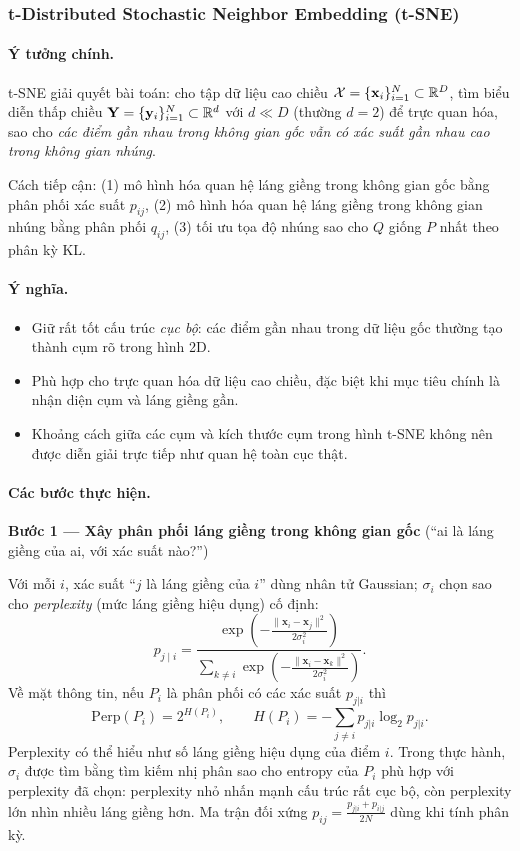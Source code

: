 \subsubsection{t-Distributed Stochastic Neighbor Embedding (t-SNE)}
\label{sec:tsne}

\paragraph{Ý tưởng chính.}
t-SNE \cite{vandermaaten2008tsne} giải quyết bài toán: cho tập dữ liệu cao chiều $\mathcal{X} = \{\mathbf{x}_i\}_{i=1}^N \subset \mathbb{R}^D$, tìm biểu diễn thấp chiều $\mathbf{Y} = \{\mathbf{y}_i\}_{i=1}^N \subset \mathbb{R}^d$ với $d \ll D$ (thường $d=2$) để trực quan hóa, sao cho \emph{các điểm gần nhau trong không gian gốc vẫn có xác suất gần nhau cao trong không gian nhúng}.

Cách tiếp cận: (1) mô hình hóa quan hệ láng giềng trong không gian gốc bằng phân phối xác suất $p_{ij}$, (2) mô hình hóa quan hệ láng giềng trong không gian nhúng bằng phân phối $q_{ij}$, (3) tối ưu tọa độ nhúng sao cho $Q$ giống $P$ nhất theo phân kỳ KL.

\paragraph{Ý nghĩa.}
\begin{itemize}
  \item Giữ rất tốt cấu trúc \emph{cục bộ}: các điểm gần nhau trong dữ liệu gốc thường tạo thành cụm rõ trong hình 2D.
  \item Phù hợp cho trực quan hóa dữ liệu cao chiều, đặc biệt khi mục tiêu chính là nhận diện cụm và láng giềng gần.
  \item Khoảng cách giữa các cụm và kích thước cụm trong hình t-SNE không nên được diễn giải trực tiếp như quan hệ toàn cục thật.
\end{itemize}

\paragraph{Các bước thực hiện.}

\textbf{Bước 1 --- Xây phân phối láng giềng trong không gian gốc} (``ai là láng giềng của ai, với xác suất nào?'')

Với mỗi $i$, xác suất ``$j$ là láng giềng của $i$'' dùng nhân tử Gaussian; $\sigma_i$ chọn sao cho \emph{perplexity} (mức láng giềng hiệu dụng) cố định:
\[
p_{j \mid i} = \frac{\exp\!\left(-\frac{\|\mathbf{x}_i - \mathbf{x}_j\|^2}{2\sigma_i^2}\right)}
{\sum_{k \neq i} \exp\!\left(-\frac{\|\mathbf{x}_i - \mathbf{x}_k\|^2}{2\sigma_i^2}\right)}.
\]
Về mặt thông tin, nếu $P_i$ là phân phối có các xác suất $p_{j|i}$ thì
\[
  \mathrm{Perp}(P_i)=2^{H(P_i)}, \qquad
  H(P_i)=-\sum_{j\ne i} p_{j|i}\log_2 p_{j|i}.
\]
Perplexity có thể hiểu như số láng giềng hiệu dụng của điểm $i$. Trong thực
hành, $\sigma_i$ được tìm bằng tìm kiếm nhị phân sao cho entropy của $P_i$
phù hợp với perplexity đã chọn: perplexity nhỏ nhấn mạnh cấu trúc rất cục bộ,
còn perplexity lớn nhìn nhiều láng giềng hơn. Ma trận đối xứng
$p_{ij} = \frac{p_{j|i}+p_{i|j}}{2N}$ dùng khi tính phân kỳ.

